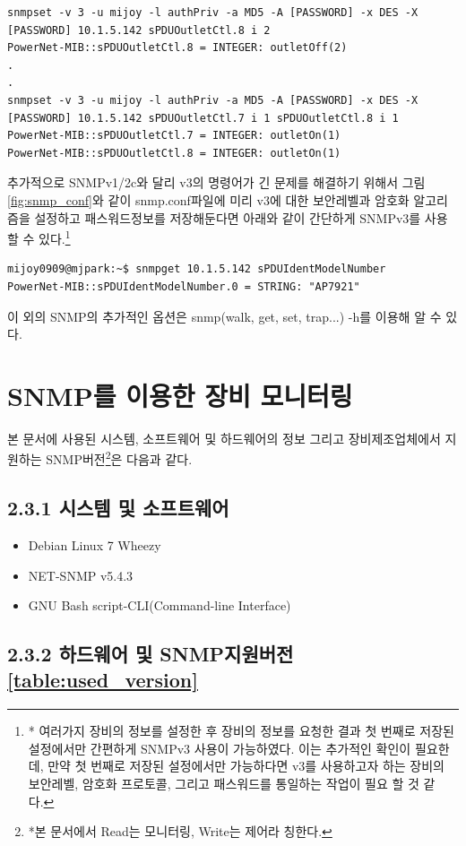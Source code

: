 \documentclass[11pt
  , a4paper
  , article
  , oneside
]{memoir}
\begin{document}
\begin{lstlisting}[style=termstyle]
snmpset -v 3 -u mijoy -l authPriv -a MD5 -A [PASSWORD] -x DES -X [PASSWORD] 10.1.5.142 sPDUOutletCtl.8 i 2
PowerNet-MIB::sPDUOutletCtl.8 = INTEGER: outletOff(2)
.
.
snmpset -v 3 -u mijoy -l authPriv -a MD5 -A [PASSWORD] -x DES -X [PASSWORD] 10.1.5.142 sPDUOutletCtl.7 i 1 sPDUOutletCtl.8 i 1
PowerNet-MIB::sPDUOutletCtl.7 = INTEGER: outletOn(1)
PowerNet-MIB::sPDUOutletCtl.8 = INTEGER: outletOn(1)
\end{lstlisting}

추가적으로 SNMPv1/2c와 달리 v3의 명령어가 긴 문제를 해결하기 위해서 그림 \ref{fig:snmp_conf}와 같이 snmp.conf파일에 미리 v3에 대한 보안레벨과 암호화 알고리즘을 설정하고 패스워드정보를 저장해둔다면 아래와 같이 간단하게 SNMPv3를 사용할 수 있다.\footnote{* 여러가지 장비의 정보를 설정한 후 장비의 정보를 요청한 결과 첫 번째로 저장된 설정에서만 간편하게 SNMPv3 사용이 가능하였다. 이는 추가적인 확인이 필요한데, 만약 첫 번째로 저장된 설정에서만 가능하다면 v3를 사용하고자 하는 장비의 보안레벨, 암호화 프로토콜, 그리고 패스워드를 통일하는 작업이 필요 할 것 같다.}

\begin{lstlisting}[style=termstyle]
mijoy0909@mjpark:~$ snmpget 10.1.5.142 sPDUIdentModelNumber
PowerNet-MIB::sPDUIdentModelNumber.0 = STRING: "AP7921"
\end{lstlisting}

이 외의 SNMP의 추가적인 옵션은 snmp(walk, get, set, trap...) -h를 이용해 알 수 있다.

\clearpage
\section{SNMP를 이용한 장비 모니터링}
본 문서에 사용된 시스템, 소프트웨어 및 하드웨어의 정보 그리고 장비제조업체에서 지원하는 SNMP버전\footnote{*본 문서에서 Read는 모니터링, Write는 제어라 칭한다.}은 다음과 같다.
\subsection{2.3.1 시스템 및 소프트웨어}
\begin{itemize}
\item Debian Linux 7 Wheezy
\item NET-SNMP v5.4.3
\item GNU Bash script-CLI(Command-line Interface) 
\end{itemize}

\subsection{2.3.2 하드웨어 및 SNMP지원버전\ref{table:used_version}}
\end{document}
